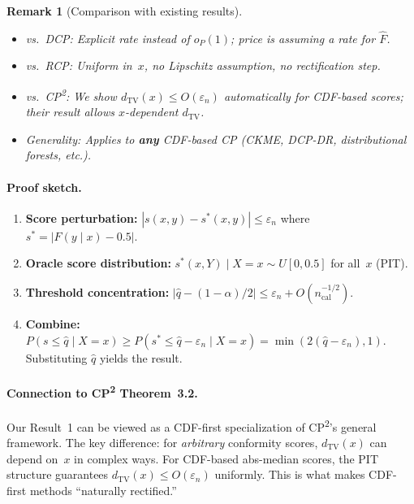 \documentclass[11pt]{article}
\newtheorem{remark}{Remark}
\begin{document}
\begin{remark}[Comparison with existing results]
\begin{itemize}
  \item \emph{vs.\ DCP:} Explicit rate instead of $o_P(1)$; price is
    assuming a rate for $\hat F$.
  \item \emph{vs.\ RCP:} Uniform in~$x$, no Lipschitz assumption, no
    rectification step.
  \item \emph{vs.\ CP\textsuperscript{2}:} We show
    $d_{\mathrm{TV}}(x) \le O(\varepsilon_n)$ automatically for
    CDF-based scores; their result allows $x$-dependent $d_{\mathrm{TV}}$.
  \item \emph{Generality:} Applies to \textbf{any} CDF-based CP
    (CKME, DCP-DR, distributional forests, etc.).
\end{itemize}
\end{remark}

\paragraph{Proof sketch.}
\begin{enumerate}
  \item \textbf{Score perturbation:}
    $|s(x,y) - s^*(x,y)| \le \varepsilon_n$ where
    $s^* = |F(y\mid x) - 0.5|$.
  \item \textbf{Oracle score distribution:}
    $s^*(x, Y) \mid X = x \sim U[0, 0.5]$ for all~$x$ (PIT).
  \item \textbf{Threshold concentration:}
    $|\hat q - (1-\alpha)/2|
    \le \varepsilon_n + O(n_{\mathrm{cal}}^{-1/2})$.
  \item \textbf{Combine:}
    $P(s \le \hat q \mid X = x)
    \ge P(s^* \le \hat q - \varepsilon_n \mid X = x)
    = \min(2(\hat q - \varepsilon_n), 1)$.
    Substituting $\hat q$ yields the result.
\end{enumerate}

\paragraph{Connection to CP\textsuperscript{2} Theorem~3.2.}
Our Result~1 can be viewed as a CDF-first specialization of
CP\textsuperscript{2}'s general framework. The key difference: for
\emph{arbitrary} conformity scores, $d_{\mathrm{TV}}(x)$ can depend
on~$x$ in complex ways. For CDF-based abs-median scores, the PIT
structure guarantees $d_{\mathrm{TV}}(x) \le O(\varepsilon_n)$
uniformly. This is what makes CDF-first methods ``naturally rectified.''
\end{document}
